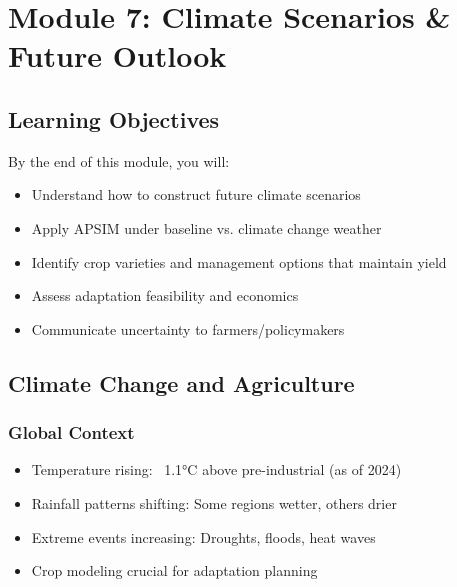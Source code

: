 
\chapter{Module 7: Climate Scenarios \& Future Outlook}
\label{ch:module7}

\section{Learning Objectives}

By the end of this module, you will:
\begin{itemize}
  \item Understand how to construct future climate scenarios
  \item Apply APSIM under baseline vs. climate change weather
  \item Identify crop varieties and management options that maintain yield
  \item Assess adaptation feasibility and economics
  \item Communicate uncertainty to farmers/policymakers
\end{itemize}

\section{Climate Change and Agriculture}

\subsection{Global Context}

\begin{itemize}
  \item Temperature rising: ~1.1°C above pre-industrial (as of 2024)
  \item Rainfall patterns shifting: Some regions wetter, others drier
  \item Extreme events increasing: Droughts, floods, heat waves
  \item Crop modeling crucial for adaptation planning
\end{itemize}


